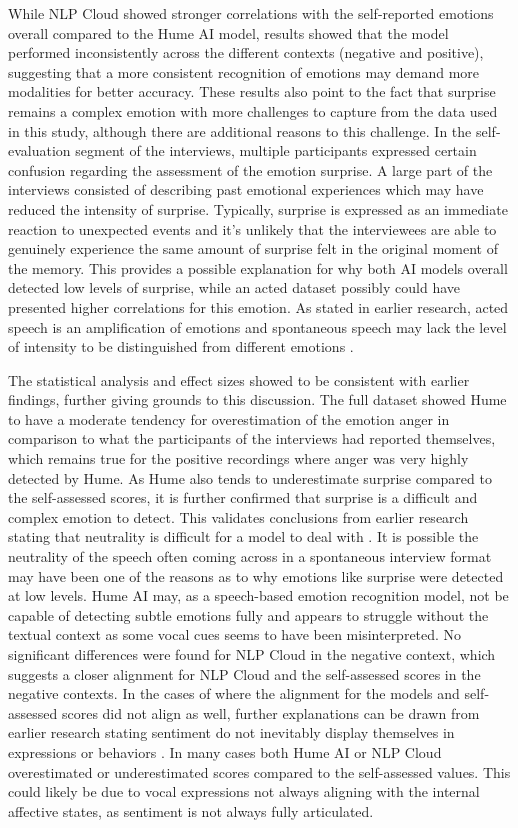 While NLP Cloud showed stronger correlations with the self-reported emotions overall compared to the Hume AI model, results showed that the model performed inconsistently across the different contexts (negative and positive), suggesting that a more consistent recognition of emotions may demand more modalities for better accuracy. These results also point to the fact that surprise remains a complex emotion with more challenges to capture from the data used in this study, although there are additional reasons to this challenge. In the self-evaluation segment of the interviews, multiple participants expressed certain confusion regarding the assessment of the emotion surprise. A large part of the interviews consisted of describing past emotional experiences which may have reduced the intensity of surprise. Typically, surprise is expressed as an immediate reaction to unexpected events and it’s unlikely that the interviewees are able to genuinely experience the same amount of surprise felt in the original moment of the memory. This provides a possible explanation for why both AI models overall detected low levels of surprise, while an acted dataset possibly could have presented higher correlations for this emotion. As stated in earlier research, acted speech is an amplification of emotions and spontaneous speech may lack the level of intensity to be distinguished from different emotions \autocite{Chakraborty2016}.

The statistical analysis and effect sizes showed to be consistent with earlier findings, further giving grounds to this discussion. 
The full dataset showed Hume to have a moderate tendency for overestimation of the emotion anger in comparison to what the participants of the interviews had reported themselves, which remains true for the positive recordings where anger was very highly detected by Hume. As Hume also tends to underestimate surprise compared to the self-assessed scores, it is further confirmed that surprise is a difficult and complex emotion to detect. This validates conclusions from earlier research stating that neutrality is difficult for a model to deal with \autocite{Cao2015}. It is possible the neutrality of the speech often coming across in a spontaneous interview format may have been one of the reasons as to why emotions like surprise were detected at low levels. Hume AI may, as a speech-based emotion recognition model, not be capable of detecting subtle emotions fully and appears to struggle without the textual context as some vocal cues seems to have been misinterpreted.
No significant differences were found for NLP Cloud in the negative context, which suggests a closer alignment for NLP Cloud and the self-assessed scores in the negative contexts.
In the cases of where the alignment for the models and self-assessed scores did not align as well, further explanations can be drawn from earlier research stating sentiment do not inevitably display themselves in expressions or behaviors \autocite{Soleymani2017}. In many cases both Hume AI or NLP Cloud overestimated or underestimated scores compared to the self-assessed values. This could likely be due to vocal expressions not always aligning with the internal affective states, as sentiment is not always fully articulated.
